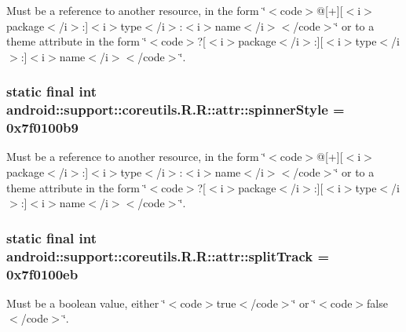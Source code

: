 Must be a reference to another resource, in the form \char`\"{}$<$code$>$@\mbox{[}+\mbox{]}\mbox{[}$<$i$>$package$<$/i$>$:\mbox{]}$<$i$>$type$<$/i$>$:$<$i$>$name$<$/i$>$$<$/code$>$\char`\"{} or to a theme attribute in the form \char`\"{}$<$code$>$?\mbox{[}$<$i$>$package$<$/i$>$:\mbox{]}\mbox{[}$<$i$>$type$<$/i$>$:\mbox{]}$<$i$>$name$<$/i$>$$<$/code$>$\char`\"{}. \hypertarget{classandroid_1_1support_1_1coreutils_1_1_r_1_1attr_39f3b67edbf8665e31c36598de65a753}{
\subsubsection[{spinnerStyle}]{\setlength{\rightskip}{0pt plus 5cm}static final int android::support::coreutils.R.R::attr::spinnerStyle = 0x7f0100b9}}
\label{classandroid_1_1support_1_1coreutils_1_1_r_1_1attr_39f3b67edbf8665e31c36598de65a753}


Must be a reference to another resource, in the form \char`\"{}$<$code$>$@\mbox{[}+\mbox{]}\mbox{[}$<$i$>$package$<$/i$>$:\mbox{]}$<$i$>$type$<$/i$>$:$<$i$>$name$<$/i$>$$<$/code$>$\char`\"{} or to a theme attribute in the form \char`\"{}$<$code$>$?\mbox{[}$<$i$>$package$<$/i$>$:\mbox{]}\mbox{[}$<$i$>$type$<$/i$>$:\mbox{]}$<$i$>$name$<$/i$>$$<$/code$>$\char`\"{}. \hypertarget{classandroid_1_1support_1_1coreutils_1_1_r_1_1attr_c6a7136ce80abcf53f741ecccd349911}{
\subsubsection[{splitTrack}]{\setlength{\rightskip}{0pt plus 5cm}static final int android::support::coreutils.R.R::attr::splitTrack = 0x7f0100eb}}
\label{classandroid_1_1support_1_1coreutils_1_1_r_1_1attr_c6a7136ce80abcf53f741ecccd349911}


Must be a boolean value, either \char`\"{}$<$code$>$true$<$/code$>$\char`\"{} or \char`\"{}$<$code$>$false$<$/code$>$\char`\"{}. 

